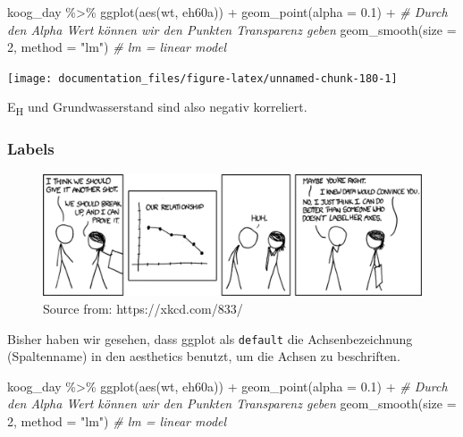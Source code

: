 \documentclass[
]{article}
\newenvironment{Shaded}{\begin{snugshade}}{\end{snugshade}}
\newcommand{\AttributeTok}[1]{\textcolor[rgb]{0.77,0.63,0.00}{#1}}
\newcommand{\CommentTok}[1]{\textcolor[rgb]{0.56,0.35,0.01}{\textit{#1}}}
\newcommand{\DecValTok}[1]{\textcolor[rgb]{0.00,0.00,0.81}{#1}}
\newcommand{\FloatTok}[1]{\textcolor[rgb]{0.00,0.00,0.81}{#1}}
\newcommand{\FunctionTok}[1]{\textcolor[rgb]{0.00,0.00,0.00}{#1}}
\newcommand{\NormalTok}[1]{#1}
\newcommand{\SpecialCharTok}[1]{\textcolor[rgb]{0.00,0.00,0.00}{#1}}
\newcommand{\StringTok}[1]{\textcolor[rgb]{0.31,0.60,0.02}{#1}}
\begin{document}
\begin{Shaded}
\begin{Highlighting}[]
\NormalTok{koog\_day  }\SpecialCharTok{\%\textgreater{}\%}
  \FunctionTok{ggplot}\NormalTok{(}\FunctionTok{aes}\NormalTok{(wt, eh60a)) }\SpecialCharTok{+}
  \FunctionTok{geom\_point}\NormalTok{(}\AttributeTok{alpha =} \FloatTok{0.1}\NormalTok{) }\SpecialCharTok{+} \CommentTok{\# Durch den Alpha Wert können wir den Punkten Transparenz geben}
  \FunctionTok{geom\_smooth}\NormalTok{(}\AttributeTok{size =} \DecValTok{2}\NormalTok{, }\AttributeTok{method =} \StringTok{"lm"}\NormalTok{) }\CommentTok{\# lm = linear model}
\end{Highlighting}
\end{Shaded}

\begin{center}\texttt{[image: documentation\_files/figure-latex/unnamed-chunk-180-1]} \end{center}

E\textsubscript{H} und Grundwasserstand sind also negativ korreliert.

\hypertarget{labels}{%
\subsubsection{Labels}\label{labels}}

\begin{figure}

{\centering \includegraphics[width=10.28in]{images/052} 

}

\caption{Source from: https://xkcd.com/833/}\label{fig:unnamed-chunk-181}
\end{figure}

Bisher haben wir gesehen, dass ggplot als \texttt{default} die Achsenbezeichnung (Spaltenname) in den aesthetics benutzt, um die Achsen zu beschriften.

\begin{Shaded}
\begin{Highlighting}[]
\NormalTok{koog\_day  }\SpecialCharTok{\%\textgreater{}\%}
  \FunctionTok{ggplot}\NormalTok{(}\FunctionTok{aes}\NormalTok{(wt, eh60a)) }\SpecialCharTok{+}
  \FunctionTok{geom\_point}\NormalTok{(}\AttributeTok{alpha =} \FloatTok{0.1}\NormalTok{) }\SpecialCharTok{+} \CommentTok{\# Durch den Alpha Wert können wir den Punkten Transparenz geben}
  \FunctionTok{geom\_smooth}\NormalTok{(}\AttributeTok{size =} \DecValTok{2}\NormalTok{, }\AttributeTok{method =} \StringTok{"lm"}\NormalTok{) }\CommentTok{\# lm = linear model}
\end{Highlighting}
\end{Shaded}
\end{document}
